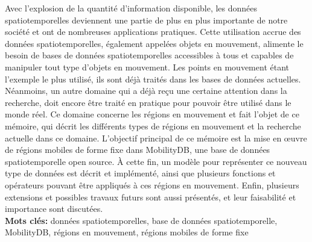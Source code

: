 Avec l'explosion de la quantité d'information disponible, les données spatiotemporelles deviennent une partie de plus en plus importante de notre société et ont de nombreuses applications pratiques. Cette utilisation accrue des données spatiotemporelles, également appelées objets en mouvement, alimente le besoin de bases de données spatiotemporelles accessibles à tous et capables de manipuler tout type d'objets en mouvement. Les points en mouvement étant l'exemple le plus utilisé, ils sont déjà traités dans les bases de données actuelles. Néanmoins, un autre domaine qui a déjà reçu une certaine attention dans la recherche, doit encore être traité en pratique pour pouvoir être utilisé dans le monde réel. Ce domaine concerne les régions en mouvement et fait l'objet de ce mémoire, qui décrit les différents types de régions en mouvement et la recherche actuelle dans ce domaine. L'objectif principal de ce mémoire est la mise en œuvre de régions mobiles de forme fixe dans MobilityDB, une base de données spatiotemporelle open source. À cette fin, un modèle pour représenter ce nouveau type de données est décrit et implémenté, ainsi que plusieurs fonctions et opérateurs pouvant être appliqués à ces régions en mouvement. Enfin, plusieurs extensions et possibles travaux futurs sont aussi présentés, et leur faisabilité et importance sont discutées. \\


\noindent\textbf{Mots clés:} données spatiotemporelles, base de données spatiotemporelle, MobilityDB, régions en mouvement, régions mobiles de forme fixe